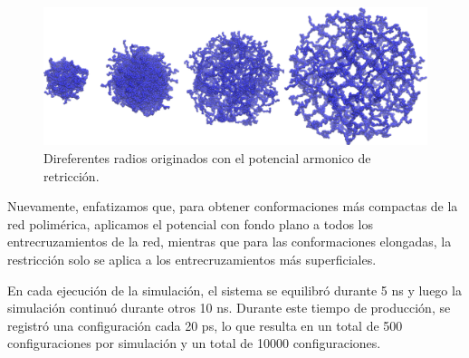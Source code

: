 \begin{figure}[!ht]
	\centering
	\includegraphics[width=0.5\linewidth]{Figures/graph-anexos/geles_radios.png}
	\caption{Direferentes radios originados con el potencial armonico de retricción. }
	\label{fig:anexo:geles}
\end{figure}


Nuevamente, enfatizamos que, para obtener conformaciones m\'as compactas de la red polim\'erica, aplicamos el potencial con fondo plano a todos los entrecruzamientos de la red, mientras que para las conformaciones elongadas, la restricci\'on solo se aplica a los entrecruzamientos m\'as superficiales.

En cada ejecuci\'on de la simulaci\'on, el sistema se equilibr\'o durante 5 ns y luego la simulaci\'on continu\'o durante otros 10 ns. Durante este tiempo de producci\'on, se registr\'o una configuraci\'on cada 20 ps, lo que resulta en un total de 500 configuraciones por simulaci\'on y un total de 10000 configuraciones.
